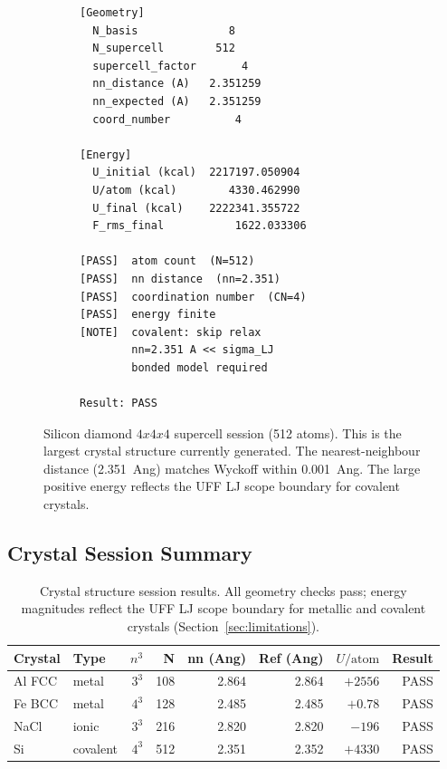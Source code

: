 \documentclass[11pt,twoside]{article}
\def\AA{Ang}%
\def\times{x}%
\begin{document}
\begin{figure}[H]
\begin{subfigure}[b]{0.50\textwidth}
\begin{lstlisting}[language={}, basicstyle=\ttfamily\scriptsize,
  frame=single, caption={Session: \texttt{xtal\_004\_diamond\_si}}]
[Geometry]
  N_basis              8
  N_supercell        512
  supercell_factor       4
  nn_distance (A)   2.351259
  nn_expected (A)   2.351259
  coord_number          4

[Energy]
  U_initial (kcal)  2217197.050904
  U/atom (kcal)        4330.462990
  U_final (kcal)    2222341.355722
  F_rms_final           1622.033306

[PASS]  atom count  (N=512)
[PASS]  nn distance  (nn=2.351)
[PASS]  coordination number  (CN=4)
[PASS]  energy finite
[NOTE]  covalent: skip relax
        nn=2.351 A << sigma_LJ
        bonded model required

Result: PASS
\end{lstlisting}
\end{subfigure}
\caption{Silicon diamond $4{\times}4{\times}4$ supercell session (512 atoms). This is the largest crystal structure currently generated. The nearest-neighbour distance (2.351~\AA) matches Wyckoff within 0.001~\AA. The large positive energy reflects the UFF LJ scope boundary for covalent crystals.}
\label{fig:si-session}
\end{figure}

\subsection{Crystal Session Summary}

\begin{table}[H]
\centering
\caption{Crystal structure session results. All geometry checks pass; energy magnitudes reflect the UFF LJ scope boundary for metallic and covalent crystals (Section~\ref{sec:limitations}).}
\label{tab:crystal-sessions}
\begin{tabular}{llrrrrrr}
\toprule
\textbf{Crystal} & \textbf{Type} & $n^3$ & \textbf{N} & \textbf{nn (\AA)} & \textbf{Ref (\AA)} & $U/\mathrm{atom}$ & \textbf{Result} \\
\midrule
Al FCC  & metal    & $3^3$ & 108 & 2.864 & 2.864 & $+2556$ & PASS \\
Fe BCC  & metal    & $4^3$ & 128 & 2.485 & 2.485 & $+0.78$ & PASS \\
NaCl    & ionic    & $3^3$ & 216 & 2.820 & 2.820 & $-196$  & PASS \\
Si      & covalent & $4^3$ & 512 & 2.351 & 2.352 & $+4330$ & PASS \\
\bottomrule
\end{tabular}
\end{table}


\end{document}

